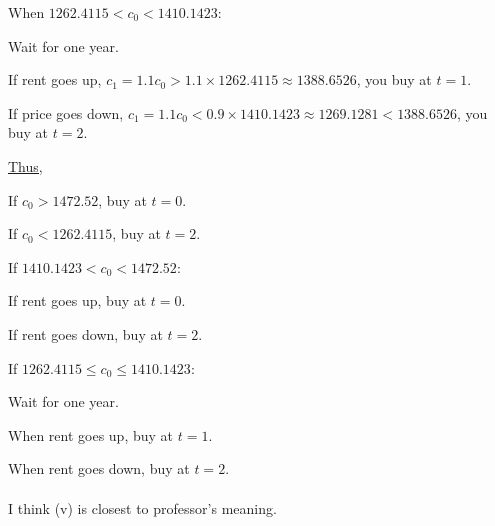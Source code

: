 \documentclass{article}
\begin{document}
When $1262.4115<c_{0}<1410.1423$:

Wait for one year.

If rent goes up, $c_{1}=1.1c_{0}>1.1\times1262.4115\approx1388.6526$, you buy at $t=1$.

If price goes down, $c_{1}=1.1c_{0}<0.9\times1410.1423\approx1269.1281<1388.6526$, you buy at $t=2$.

\underline{Thus,}

If $c_{0}>1472.52$, buy at $t=0$.

If $c_{0}<1262.4115$, buy at $t=2$.

If $1410.1423<c_{0}<1472.52$:

If rent goes up, buy at $t=0$.

If rent goes down, buy at $t=2$.

If $1262.4115\leqslant c_{0}\leqslant1410.1423$:

Wait for one year.

When rent goes up, buy at $t=1$.

When rent goes down, buy at $t=2$.
\\
\\
I think (v) is closest to professor's meaning.
\end{document}
